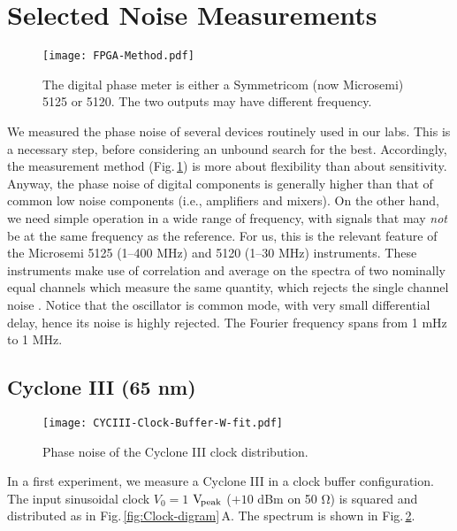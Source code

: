 \documentclass{article}
\newcommand{\unit}[1]{\ensuremath{\mathrm{#1}}}
\newcommand{\ohm}{\ensuremath{\mathrm{\Omega}}}
\begin{document}
\section{Selected Noise Measurements}\label{sec:Selected-devices}
\begin{figure}
\centering\texttt{[image: FPGA-Method.pdf]}
\caption{The digital phase meter is either a Symmetricom (now Microsemi) 5125 or 5120.  The two outputs may have different frequency.}
\label{fig:FPGA-Method}
\end{figure}
We measured the phase noise of several devices routinely used in our labs.  This is a necessary step, before considering an unbound search for the best.
Accordingly, the measurement method (Fig.\,\ref{fig:FPGA-Method}) is more about flexibility than about sensitivity.  Anyway, the phase noise of digital components is generally higher than that of common low noise components (i.e., amplifiers and mixers).  On the other hand, we need simple operation in a wide range of frequency, with signals that may \emph{not} be at the same frequency as the reference.  For us, this is the relevant feature of the Microsemi 5125 (1--400 MHz) and 5120 (1--30 MHz) instruments.  These instruments make use of correlation and average on the spectra of two nominally equal channels which measure the same quantity, which rejects the single channel noise \cite{Rubiola-2010:xsp,Stein-2010:avar}.  Notice that the oscillator is common mode, with very small differential delay, hence its noise is highly rejected.
The Fourier frequency spans from 1 mHz to 1 MHz.


\subsection{Cyclone III (65 nm)}\label{Cyclone-III}
\begin{figure}[t]
\centering
\texttt{[image: CYCIII-Clock-Buffer-W-fit.pdf]}
\caption{Phase noise of the Cyclone III clock distribution.}
\label{fig:CYCIII-Clock-buffer-W-fit}
\end{figure}

In a first experiment, we measure a Cyclone III \cite{Cyclone-III} in a clock buffer configuration. The input sinusoidal clock $V_0=1$ \unit{V_\text{\!peak}} ($+10$ dBm on 50 \ohm) is squared and distributed as in Fig.\,\ref{fig:Clock-digram}\,A\@.  The spectrum is shown in Fig.\,\ref{fig:CYCIII-Clock-buffer-W-fit}.
\end{document}

